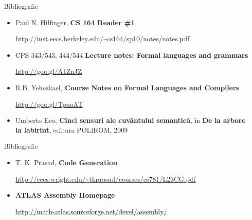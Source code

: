 \documentclass[pdf]{beamer}
\begin{document}
\begin{frame}{Bibliografie}
\begin{itemize}
\item
Paul N. Hilfinger, \textbf{CS 164 Reader \#1}

\url{http://inst.eecs.berkeley.edu/~cs164/sp10/notes/notes.pdf}
\newline

\item
CPS 343/543, 444/544 \textbf{Lecture notes: Formal languages and grammars}

\url{http://goo.gl/A1ZnJZ}
\newline

\item
R.B. Yehezkael, \textbf{Course Notes on Formal Languages and Compilers} 

\url{http://goo.gl/TpuoAT}
\newline

\item
Umberto Eco, \textbf{Cinci sensuri ale cuvântului semantică}, în \textbf{De la arbore la labirint}, editura POLIROM, 2009
\end{itemize}
\end{frame}



\begin{frame}{Bibliografie}
\begin{itemize}
\item
T. K. Prasad, \textbf{Code Generation}

\url{http://cecs.wright.edu/~tkprasad/courses/cs781/L23CG.pdf}

\item
\textbf{ATLAS Assembly Homepage}

\url{http://math-atlas.sourceforge.net/devel/assembly/}

\end{itemize}
\end{frame}
\end{document}
